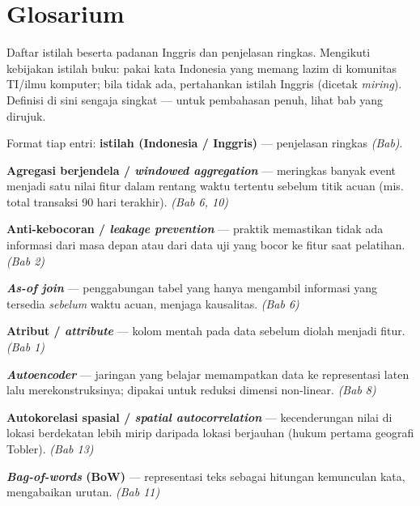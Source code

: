 \chapter{Glosarium}\label{glosarium}

Daftar istilah beserta padanan Inggris dan penjelasan ringkas. Mengikuti kebijakan istilah buku: pakai kata Indonesia yang memang lazim di komunitas TI/ilmu komputer; bila tidak ada, pertahankan istilah Inggris (dicetak \emph{miring}). Definisi di sini sengaja singkat --- untuk pembahasan penuh, lihat bab yang dirujuk.

Format tiap entri: \textbf{istilah (Indonesia / Inggris)} --- penjelasan ringkas \emph{(Bab)}.


\textbf{Agregasi berjendela / \emph{windowed aggregation}} --- meringkas banyak event menjadi
satu nilai fitur dalam rentang waktu tertentu sebelum titik acuan (mis. total
transaksi 90 hari terakhir). \emph{(Bab 6, 10)}

\textbf{Anti-kebocoran / \emph{leakage prevention}} --- praktik memastikan tidak ada
informasi dari masa depan atau dari data uji yang bocor ke fitur saat pelatihan.
\emph{(Bab 2)}

\textbf{\emph{As-of join}} --- penggabungan tabel yang hanya mengambil informasi yang tersedia
\emph{sebelum} waktu acuan, menjaga kausalitas. \emph{(Bab 6)}

\textbf{Atribut / \emph{attribute}} --- kolom mentah pada data sebelum diolah menjadi fitur.
\emph{(Bab 1)}

\textbf{\emph{Autoencoder}} --- jaringan yang belajar memampatkan data ke representasi laten
lalu merekonstruksinya; dipakai untuk reduksi dimensi non-linear. \emph{(Bab 8)}

\textbf{Autokorelasi spasial / \emph{spatial autocorrelation}} --- kecenderungan nilai di
lokasi berdekatan lebih mirip daripada lokasi berjauhan (hukum pertama geografi
Tobler). \emph{(Bab 13)}


\textbf{\emph{Bag-of-words} (BoW)} --- representasi teks sebagai hitungan kemunculan kata,
mengabaikan urutan. \emph{(Bab 11)}

